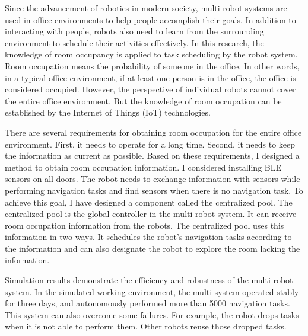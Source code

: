 
Since the advancement of robotics in modern society, multi-robot systems are used in office environments to help people accomplish their goals. In addition to interacting with people, robots also need to learn from the surrounding environment to schedule their activities effectively. 
In this research, the knowledge of room occupancy is applied to task scheduling by the robot system. Room occupation means the probability of someone in the office.  In other words, in a typical office environment,  if at least one person is in the office, the office is considered occupied. However, the perspective of individual robots cannot cover the entire office environment. But the knowledge of room occupation can be established by the Internet of Things (IoT) technologies.

There are several requirements for obtaining room occupation for the entire office environment. First, it needs to operate for a long time. Second, it needs to keep the information as current as possible. Based on these requirements, I designed a method to obtain room occupation information. I considered installing BLE sensors on all doors. The robot needs to exchange information with sensors while performing navigation tasks and find sensors when there is no navigation task. To achieve this goal, I have designed a component called the centralized pool. The centralized pool is the global controller in the multi-robot system. It can receive room occupation information from the robots. 
The centralized pool uses this information in two ways. It schedules the robot's navigation tasks according to the information and can also designate the robot to explore the room lacking the information.

Simulation results demonstrate the efficiency and robustness of the multi-robot system. In the simulated working environment, the multi-system operated stably for three days, and autonomously performed more than 5000 navigation tasks. This system can also overcome some failures. For example, the robot drops tasks when it is not able to perform them. Other robots reuse those dropped tasks.


\cleardoublepage
